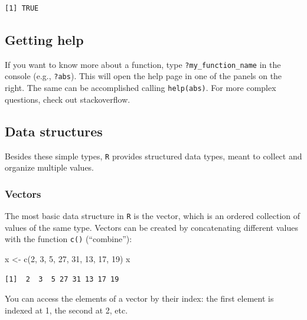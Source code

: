 \documentclass[
  letterpaper,
  DIV=11,
  numbers=noendperiod]{scrreprt}
\newenvironment{Shaded}{\begin{snugshade}}{\end{snugshade}}
\newcommand{\DecValTok}[1]{\textcolor[rgb]{0.68,0.00,0.00}{#1}}
\newcommand{\FunctionTok}[1]{\textcolor[rgb]{0.28,0.35,0.67}{#1}}
\newcommand{\NormalTok}[1]{\textcolor[rgb]{0.00,0.23,0.31}{#1}}
\newcommand{\OtherTok}[1]{\textcolor[rgb]{0.00,0.23,0.31}{#1}}
\begin{document}
\begin{verbatim}
[1] TRUE
\end{verbatim}

\hypertarget{getting-help}{%
\subsection{Getting help}\label{getting-help}}

If you want to know more about a function, type
\texttt{?my\_function\_name} in the console (e.g., \texttt{?abs}). This
will open the help page in one of the panels on the right. The same can
be accomplished calling \texttt{help(abs)}. For more complex questions,
check out stackoverflow.

\hypertarget{data-structures}{%
\subsection{Data structures}\label{data-structures}}

Besides these simple types, \texttt{R} provides structured data types,
meant to collect and organize multiple values.

\hypertarget{vectors}{%
\subsubsection{Vectors}\label{vectors}}

The most basic data structure in \texttt{R} is the vector, which is an
ordered collection of values of the same type. Vectors can be created by
concatenating different values with the function \texttt{c()}
(``combine''):

\begin{Shaded}
\begin{Highlighting}[]
\NormalTok{x }\OtherTok{\textless{}{-}} \FunctionTok{c}\NormalTok{(}\DecValTok{2}\NormalTok{, }\DecValTok{3}\NormalTok{, }\DecValTok{5}\NormalTok{, }\DecValTok{27}\NormalTok{, }\DecValTok{31}\NormalTok{, }\DecValTok{13}\NormalTok{, }\DecValTok{17}\NormalTok{, }\DecValTok{19}\NormalTok{) }
\NormalTok{x}
\end{Highlighting}
\end{Shaded}

\begin{verbatim}
[1]  2  3  5 27 31 13 17 19
\end{verbatim}

You can access the elements of a vector by their index: the first
element is indexed at 1, the second at 2, etc.
\end{document}
